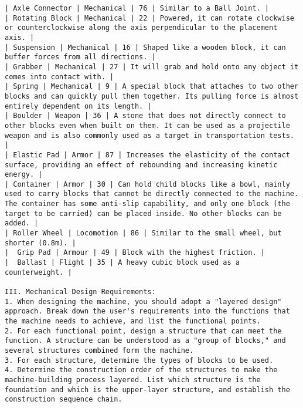\begin{lstlisting}
| Axle Connector | Mechanical | 76 | Similar to a Ball Joint. |
| Rotating Block | Mechanical | 22 | Powered, it can rotate clockwise or counterclockwise along the axis perpendicular to the placement axis. |
| Suspension | Mechanical | 16 | Shaped like a wooden block, it can buffer forces from all directions. |
| Grabber | Mechanical | 27 | It will grab and hold onto any object it comes into contact with. |
| Spring | Mechanical | 9 | A special block that attaches to two other blocks and can quickly pull them together. Its pulling force is almost entirely dependent on its length. |
| Boulder | Weapon | 36 | A stone that does not directly connect to other blocks even when built on them. It can be used as a projectile weapon and is also commonly used as a target in transportation tests. |
| Elastic Pad | Armor | 87 | Increases the elasticity of the contact surface, providing an effect of rebounding and increasing kinetic energy. |
| Container | Armor | 30 | Can hold child blocks like a bowl, mainly used to carry blocks that cannot be directly connected to the machine. The container has some anti-slip capability, and only one block (the target to be carried) can be placed inside. No other blocks can be added. |
| Roller Wheel | Locomotion | 86 | Similar to the small wheel, but shorter (0.8m). |
|  Grip Pad | Armour | 49 | Block with the highest friction. |
|  Ballast | Flight | 35 | A heavy cubic block used as a counterweight. |

III. Mechanical Design Requirements:
1. When designing the machine, you should adopt a "layered design" approach. Break down the user's requirements into the functions that the machine needs to achieve, and list the functional points.
2. For each functional point, design a structure that can meet the function. A structure can be understood as a "group of blocks," and several structures combined form the machine.
3. For each structure, determine the types of blocks to be used.
4. Determine the construction order of the structures to make the machine-building process layered. List which structure is the foundation and which is the upper-layer structure, and establish the construction sequence chain.


\end{lstlisting}
